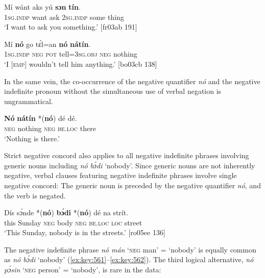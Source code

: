 \ea%
    \label{ex:key:557}
    \gll Mí    wánt  aks yú    \textbf{sɔn}    \textbf{tín}.\\
\textsc{1sg.indp}  want  ask  \textsc{2sg.indp}  some  thing\\

\glt ‘I want to ask you something.’ [fr03ab 191]
\z


\z


\ea%
    \label{ex:key:559}
    \gll Mí    \textbf{nó}  go  tɛ́l=an    \textbf{nó}  \textbf{nátín}.\\
\textsc{1sg.indp}  \textsc{neg}  \textsc{pot}  tell=\textsc{3sg.obj}  \textsc{neg}  nothing\\

\glt ‘I \textsc{[emp]} wouldn’t tell him anything.’ [bo03cb 138]
\z

In the same vein, the co-occurrence of the negative quantifier \textit{nó} and the negative indefinite pronoun without the simultaneous use of verbal negation is ungrammatical. 


\ea%
    \label{ex:key:560}
    \gll \textbf{Nó}   \textbf{nátín}  *(\textbf{nó})  dé    dé.\\
\textsc{neg}  nothing  \textsc{neg}    \textsc{be.loc}  there\\

\glt ‘Nothing is there.’
\z

Strict negative concord also applies to all negative indefinite phrases involving generic nouns including \textit{nó} \textit{bɔ́di} ‘nobody’. Since generic nouns are not inherently negative, verbal clauses featuring negative indefinite phrases involve single negative concord: The generic noun is preceded by the negative quantifier \textit{nó}, and the verb is negated. 


\ea%
    \label{ex:key:561}
    \gll Dís  sɔ́nde  *(\textbf{nó}) \textbf{  bɔ́di}   *(\textbf{nó})  dé    na  strít.\\
this  Sunday  \textsc{neg}    body  \textsc{neg}    \textsc{be.loc}  \textsc{loc}  street\\

\glt ‘This Sunday, nobody is in the streets.’ [ro05ee 136]
\z

The negative indefinite phrase \textit{nó mán} ‘\textsc{neg} man’ = ‘nobody’ is equally common as \textit{nó bɔ́di} ‘nobody’ (\ref{ex:key:561}–\ref{ex:key:562}). The third logical alternative, \textit{nó pɔ́sin} ‘\textsc{neg} person’ = ‘nobody’, is rare in the data: 


